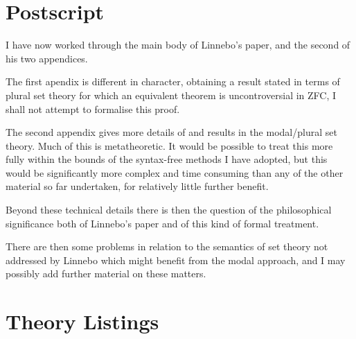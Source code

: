 
\section{Postscript}\label{POSTSCRIPT}

I have now worked through the main body of Linnebo's paper, and the second of his two appendices.

The first apendix is different in character, obtaining a result stated in terms of plural set theory for which an equivalent theorem is uncontroversial in ZFC, I shall not attempt to formalise this proof.

The second appendix gives more details of and results in the modal/plural set theory.
Much of this is metatheoretic.
It would be possible to treat this more fully within the bounds of the syntax-free methods I have adopted, but this would be significantly more complex and time consuming than any of the other material so far undertaken, for relatively little further benefit.

Beyond these technical details there is then the question of the philosophical significance both of Linnebo's paper and of this kind of formal treatment.

There are then some problems in relation to the semantics of set theory not addressed by Linnebo which might benefit from the modal approach, and I may possibly add further material on these matters.

\pagebreak

\appendix

\section{Theory Listings}

{
\let\Section\subsection
\let\Subsection\subsubsection
\def\subsection#1{\Subsection*{#1}}

\def\section#1{\Section{#1}\label{t046a}\index{t046a}}

\pagebreak
\def\section#1{\Section{#1}\label{t046b}\index{t046b}}

}  %


